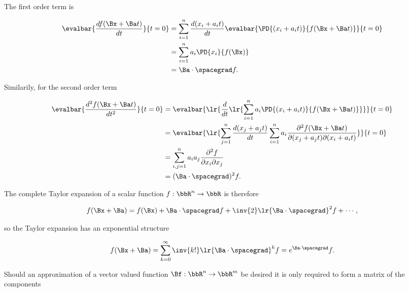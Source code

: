 The first order term is

\begin{dmath}\label{eqn:jacobianAndHessian:80}
\begin{aligned}
\evalbar{\frac{df(\Bx + \Ba t)}{dt}}{t = 0}
&=
\sum_{i = 1}^n
\frac{d( x_i + a_i t)}{dt}
\evalbar{\PD{(x_i + a_i t)}{f(\Bx + \Ba t)}}{t = 0} \\
&=
\sum_{i = 1}^n
a_i
\PD{x_i}{f(\Bx)} \\
&= \Ba \cdot \spacegrad f.
\end{aligned}
\end{dmath}

Similarily, for the second order term

\begin{dmath}\label{eqn:jacobianAndHessian:100}
\begin{aligned}
\evalbar{\frac{d^2 f(\Bx + \Ba t)}{dt^2}}{t = 0}
&=
\evalbar{\lr{
   \frac{d}{dt}
   \lr{
   \sum_{i = 1}^n
   a_i
   \PD{(x_i + a_i t)}{f(\Bx + \Ba t)}
   }
   }
}{t = 0} \\
&=
\evalbar{
   \lr{
      \sum_{j = 1}^n
      \frac{d(x_j + a_j t)}{dt}
         \sum_{i = 1}^n
         a_i
      \frac{\partial^2 f(\Bx + \Ba t)}{\partial (x_j + a_j t) \partial (x_i + a_i t) }
   }
}{t = 0} \\
&=
\sum_{i,j = 1}^n a_i a_j \frac{\partial^2 f}{\partial x_i \partial x_j} \\
&=
(\Ba \cdot \spacegrad)^2 f.
\end{aligned}
\end{dmath}

The complete Taylor expansion of a scalar function \( f : \bbR^n \rightarrow \bbR \) is therefore

\begin{dmath}\label{eqn:jacobianAndHessian:120}
f(\Bx + \Ba)
= f(\Bx) +
\Ba \cdot \spacegrad f +
\inv{2} \lr{ \Ba \cdot \spacegrad}^2 f + \cdots,
\end{dmath}

so the Taylor expansion has an exponential structure

\begin{equation}\label{eqn:jacobianAndHessian:140}
f(\Bx + \Ba) = \sum_{k = 0}^\infty \inv{k!} \lr{ \Ba \cdot \spacegrad}^k f = e^{\Ba \cdot \spacegrad} f.
\end{equation}

Should an approximation of a vector valued function \( \Bf : \bbR^n \rightarrow \bbR^m \) be desired it is only required to form a matrix of the components

